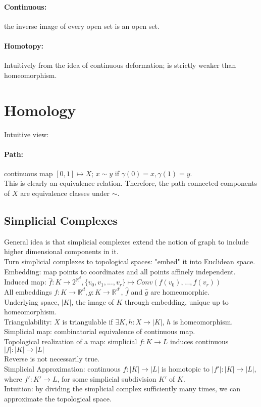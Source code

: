 \documentclass[10pt,a4paper]{report}
\begin{document}
\paragraph{Continuous:}the inverse image of every open set is an open set.

\paragraph{Homotopy:}
Intuitively from the idea of continuous deformation; is strictly weaker than homeomorphism.

\section{Homology}
Intuitive view:\\
\paragraph{Path:} continuous map $[0,1]\mapsto X$; $x\sim y$ if $\gamma(0)=x,\gamma(1)=y$.\\
This is clearly an equivalence relation. Therefore, the path connected components of $X$ are equivalence classes under $\sim$.
\subsection{Simplicial Complexes}
General idea is that simplicial complexes extend the notion of graph to include higher dimensional components in it.\\
Turn simplicial complexes to topological spaces: "embed" it into Euclidean space.\\
Embedding: map points to coordinates and all points affinely independent.\\
Induced map: $\hat{f}:K\to 2^{\mathbb{R}^d},\{ v_0,v_1,...,v_r\}\mapsto Conv(f(v_0),...,f(v_r))$\\
All embeddings $f:K\to\mathbb{R}^d,g:K\to\mathbb{R}^{d'}$, $\hat{f}$ and $\hat{g}$ are homeomorphic.\\
Underlying space, $|K|$, the image of $K$ through embedding, unique up to homeomorphism.\\
Triangulability: $X$ is triangulable if $\exists K,h:X\to|K|$, $h$ is homeomorphism.\\
Simplicial map: combinatorial equivalence of continuous map.\\
Topological realization of a map: simplicial $f:K\to L$ induces continuous $|f|:|K|\to|L|$\\
Reverse is not necessarily true.\\
Simplicial Approximation: continuous $f:|K|\to|L|$ is homotopic to $|f'|:|K|\to|L|$, where $f':K'\to L$, for some simplicial subdivision $K'$ of $K$.\\
Intuition: by dividing the simplicial complex sufficiently many times, we can approximate the topological space.
\end{document}
